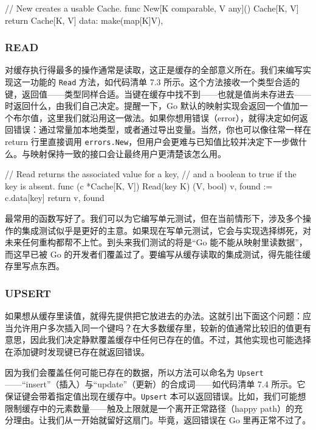 \begin{gocode}[title={代码清单 7.2 \texttt{cache.go}}]
// New creates a usable Cache.
func New[K comparable, V any]() Cache[K, V] {
    return Cache[K, V]{
        data: make(map[K]V),
    }
}
\end{gocode}

\subsubsection*{READ}

对缓存执行得最多的操作通常是读取，这正是缓存的全部意义所在。我们来编写实现这一功能的 \texttt{Read} 方法，如代码清单 7.3 所示。这个方法接收一个类型合适的键，返回值——类型同样合适。当键在缓存中找不到——也就是值尚未存进去——时返回什么，由我们自己决定。提醒一下，Go 默认的映射实现会返回一个值加一个布尔值，这里我们就沿用这一做法。如果你想用错误（error），就得决定如何返回错误：通过常量加本地类型，或者通过导出变量。当然，你也可以像往常一样在 return 行里直接调用 \texttt{errors.New}，但用户会更难与已知值比较并决定下一步做什么。与映射保持一致的接口会让最终用户更清楚该怎么用。

\begin{gocode}[title={代码清单 7.3 \texttt{cache.go}：在缓存上实现 \texttt{Read} 方法}]
// Read returns the associated value for a key,
// and a boolean to true if the key is absent.
func (c *Cache[K, V]) Read(key K) (V, bool) {
    v, found := c.data[key]
    return v, found
}
\end{gocode}

最常用的函数写好了。我们可以为它编写单元测试，但在当前情形下，涉及多个操作的集成测试似乎是更好的主意。如果现在写单元测试，它会与实现选择绑死，对未来任何重构都帮不上忙。到头来我们测试的将是``Go 能不能从映射里读数据''，而这早已被 Go 的开发者们覆盖过了。要编写从缓存读取的集成测试，得先能往缓存里写点东西。

\subsubsection*{UPSERT}

如果想从缓存里读值，就得先提供把它放进去的办法。这就引出下面这个问题：应当允许用户多次插入同一个键吗？在大多数缓存里，较新的值通常比较旧的值更有意思，因此我们决定静默覆盖缓存中任何已存在的值。不过，其他实现也可能选择在添加键时发现键已存在就返回错误。

因为我们会覆盖任何可能已存在的数据，所以方法可以命名为 \texttt{Upsert}——``insert''（插入）与``update''（更新）的合成词——如代码清单 7.4 所示。它保证键会带着指定值出现在缓存中。\texttt{Upsert} 本可以返回错误。比如，我们可能想限制缓存中的元素数量——触及上限就是一个离开正常路径（happy path）的充分理由。让我们从一开始就留好这扇门。毕竟，返回错误在 Go 里再正常不过了。

